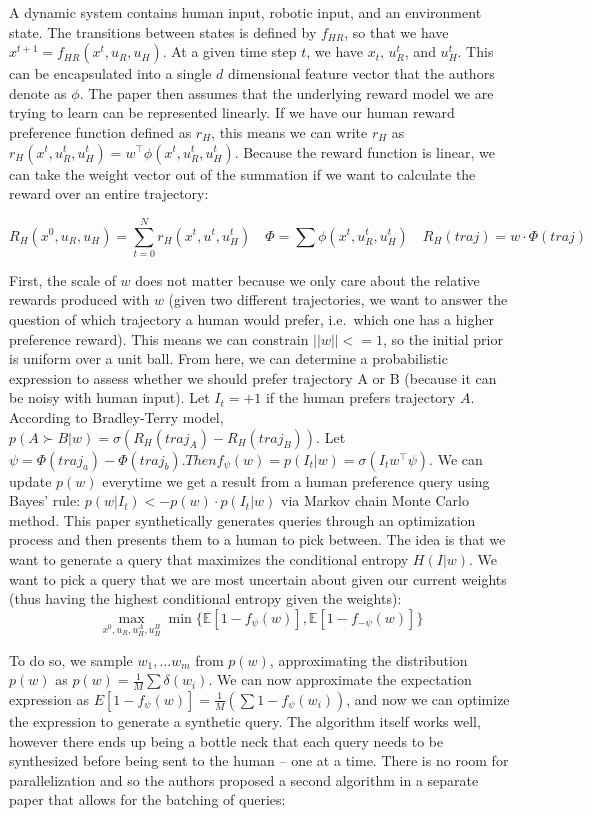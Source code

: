 \documentclass[
  letterpaper,
  numbers=noenddot,
  DIV=11]{scrreprt}
\theoremstyle{plain}
\theoremstyle{definition}
\theoremstyle{remark}
\begin{document}
A dynamic system contains human input, robotic input, and an environment
state. The transitions between states is defined by \(f_{HR}\), so that
we have \(x^{t+1} = f_{HR}(x^t, u_R, u_H)\). At a given time step \(t\),
we have \(x_t\), \(u_R^t\), and \(u_H^t\). This can be encapsulated into
a single \(d\) dimensional feature vector that the authors denote as
\(\phi\). The paper then assumes that the underlying reward model we are
trying to learn can be represented linearly. If we have our human reward
preference function defined as \(r_H\), this means we can write \(r_H\)
as \(r_H(x^t, u_R^t, u_H^t) = w^{\intercal}\phi(x^t, u_R^t, u_H^t)\).
Because the reward function is linear, we can take the weight vector out
of the summation if we want to calculate the reward over an entire
trajectory:

\[R_{H}(x^0, u_R, u_H) = \sum_{t=0}^{N} r_{H}(x^t, u^t, u_H^t) \quad \Phi = \sum \phi(x^t, u_R^t, u_H^t) \quad R_H(traj) = w\cdot\Phi(traj)\]

First, the scale of \(w\) does not matter because we only care about the
relative rewards produced with \(w\) (given two different trajectories,
we want to answer the question of which trajectory a human would prefer,
i.e.~which one has a higher preference reward). This means we can
constrain \(||w|| <= 1\), so the initial prior is uniform over a unit
ball. From here, we can determine a probabilistic expression to assess
whether we should prefer trajectory A or B (because it can be noisy with
human input). Let \(I_t = +1\) if the human prefers trajectory \(A\).
According to Bradley-Terry model,
\(p(A \succ B|w) = \sigma(R_H(traj_A) - R_H(traj_B))\). Let
\(\psi = \Phi(traj_a) - \Phi(traj_b). Then f_{\psi} (w) = p(I_t|w) = \sigma(I_t w^{\intercal}\psi)\).
We can update \(p(w)\) everytime we get a result from a human preference
query using Bayes' rule: \(p(w|I_t) <- p(w) \cdot p(I_t|w)\) via Markov
chain Monte Carlo method. This paper synthetically generates queries
through an optimization process and then presents them to a human to
pick between. The idea is that we want to generate a query that
maximizes the conditional entropy \(H(I|w)\). We want to pick a query
that we are most uncertain about given our current weights (thus having
the highest conditional entropy given the weights):
\[\max_{x^0, u_R, u_H^A, u_H^B} \min\{\mathbb{E}[1-f_{\psi}(w)], \mathbb{E}[1 - f_{-\psi}(w)]\}\]

To do so, we sample \(w_1, ... w_m\) from \(p(w)\), approximating the
distribution \(p(w)\) as \(p(w) = \frac{1}{M} \sum \delta (w_i).\) We
can now approximate the expectation expression as
\(E[1 - f_{\psi}(w)] = \frac{1}{M} (\sum 1 - f_{\psi}(w_i))\), and now
we can optimize the expression to generate a synthetic query. The
algorithm itself works well, however there ends up being a bottle neck
that each query needs to be synthesized before being sent to the human
-- one at a time. There is no room for parallelization and so the
authors proposed a second algorithm in a separate paper that allows for
the batching of queries:
\end{document}
